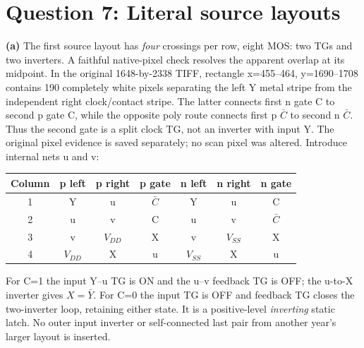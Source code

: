 \documentclass[10pt]{article}
\newcommand{\mos}[4]{\begin{scope}[shift={(#1,#2)}]
\draw(0,.24)--(0,-.24);\draw(0,.2)--(.25,.2)--(.25,.5);\draw(0,-.2)--(.25,-.2)--(.25,-.5);
\draw(-.16,.23)--(-.16,-.23);
\ifnum#4=1\draw(-.26,0)circle(.06);\draw(-.75,0)--(-.32,0);\else\draw(-.75,0)--(-.16,0);\fi
\node[anchor=east,font=\scriptsize]at(-.76,0){$#3$};\end{scope}}
\begin{document}
\newpage\section*{Question 7: Literal source layouts}
\textbf{(a)} The first source layout has \emph{four} crossings per row, eight MOS: two TGs and two inverters. A faithful native-pixel check resolves the apparent overlap at its midpoint. In the original 1648-by-2338 TIFF, rectangle x=455--464, y=1690--1708 contains 190 completely white pixels separating the left Y metal stripe from the independent right clock/contact stripe. The latter connects first n gate C to second p gate C, while the opposite poly route connects first p $\bar C$ to second n $\bar C$. Thus the second gate is a split clock TG, not an inverter with input Y. The original pixel evidence is saved separately; no scan pixel was altered.
Introduce internal nets u and v:
\begin{center}\begin{tabular}{c|ccc|ccc}\toprule
Column&p left&p right&p gate&n left&n right&n gate\\\midrule
1&Y&u&$\bar C$&Y&u&C\\2&u&v&C&u&v&$\bar C$\\
3&v&$V_{DD}$&X&v&$V_{SS}$&X\\4&$V_{DD}$&X&u&$V_{SS}$&X&u\\\bottomrule
\end{tabular}\end{center}
\begin{center}\end{center}
For C=1 the input Y--u TG is ON and the u--v feedback TG is OFF; the u-to-X inverter gives $X=\bar Y$. For C=0 the input TG is OFF and feedback TG closes the two-inverter loop, retaining either state. It is a positive-level \emph{inverting} static latch. No outer input inverter or self-connected last pair from another year's larger layout is inserted.
\end{document}
